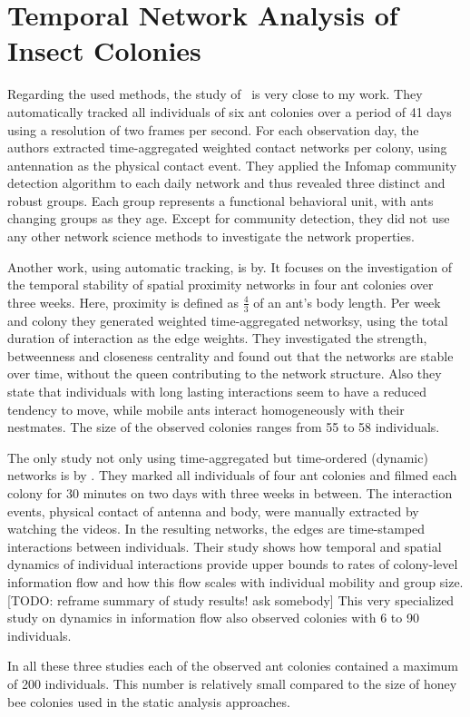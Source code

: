 \section{Temporal Network Analysis of Insect Colonies}

Regarding the used methods, the study of~\textcite{mersch2013tracking} is very close to my work.
They automatically tracked all individuals of six ant colonies over a period of 41 days using a resolution of two frames per second.
For each observation day, the authors extracted time-aggregated weighted contact networks per colony, using antennation as the physical contact event.
They applied the Infomap community detection algorithm to each daily network and thus revealed three distinct and robust groups.
Each group represents a functional behavioral unit, with ants changing groups as they age.
Except for community detection, they did not use any other network science methods to investigate the network properties.


Another work, using automatic tracking, is by\textcite{jeanson2012long}.
It focuses on the investigation of the temporal stability of spatial proximity networks in four ant colonies over three weeks.
Here, proximity is defined as $\frac{4}{3}$ of an ant’s body length.
Per week and colony they generated weighted time-aggregated networksy,  using the total duration of interaction as the edge weights.
They investigated the strength, betweenness and closeness centrality and found out that the networks are stable over time, without the queen contributing to the network structure.
Also they state that individuals with long lasting interactions seem to have a reduced tendency to move, while mobile ants interact homogeneously with their nestmates.
The size of the observed colonies ranges from 55 to 58 individuals.


The only study not only using time-aggregated but time-ordered (dynamic) networks is by \textcite{blonder2011time}.
They marked all individuals of four ant colonies and filmed each colony for 30 minutes on two days with three weeks in between.
The interaction events, physical contact of antenna and body, were manually extracted by watching the videos. In the resulting networks, the edges are  time-stamped interactions between individuals.
Their study shows how temporal and spatial dynamics of individual interactions provide upper bounds to rates of colony-level information flow and how this flow scales with individual mobility and group size. [TODO: reframe summary of study results! ask somebody]
This very specialized study on dynamics in information flow also observed colonies with 6 to 90 individuals.


In all these three studies each of the observed ant colonies contained a maximum of 200 individuals. This number is relatively small compared to the size of honey bee colonies used in the static analysis approaches.

